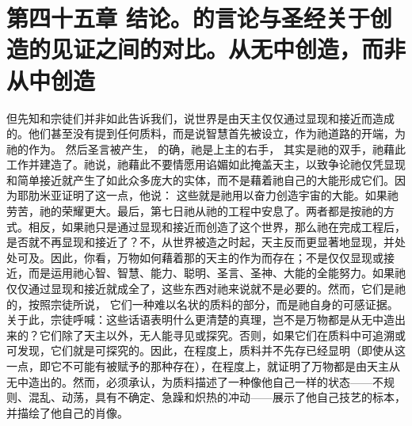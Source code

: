 
\section{第四十五章  结论。的言论与圣经关于创造的见证之间的对比。从无中创造，而非从中创造}

但先知和宗徒们并非如此告诉我们，说世界是由天主仅仅通过显现和接近而造成的。他们甚至没有提到任何质料，而是说智慧首先被设立，作为祂道路的开端，为祂的作为。 然后圣言被产生， 的确，祂是上主的右手， 其实是祂的双手，祂藉此工作并建造了。祂说，祂藉此不要情愿用谄媚如此掩盖天主，以致争论祂仅凭显现和简单接近就产生了如此众多庞大的实体，而不是藉着祂自己的大能形成它们。因为耶肋米亚证明了这一点，他说： 这些就是祂用以奋力创造宇宙的大能。如果祂劳苦，祂的荣耀更大。最后，第七日祂从祂的工程中安息了。两者都是按祂的方式。相反，如果祂只是通过显现和接近而创造了这个世界，那么祂在完成工程后，是否就不再显现和接近了？不，从世界被造之时起，天主反而更显著地显现，并处处可及。因此，你看，万物如何藉着那的天主的作为而存在；不是仅仅显现或接近，而是运用祂心智、智慧、能力、聪明、圣言、圣神、大能的全能努力。如果祂仅仅通过显现和接近就成全了，这些东西对祂来说就不是必要的。然而，它们是祂的，按照宗徒所说， 它们一种难以名状的质料的部分，而是祂自身的可感证据。 关于此，宗徒呼喊：这些话语表明什么更清楚的真理，岂不是万物都是从无中造出来的？它们除了天主以外，无人能寻见或探究。否则，如果它们在质料中可追溯或可发现，它们就是可探究的。因此，在程度上，质料并不先存已经显明（即使从这一点，即它不可能有被赋予的那种存在），在程度上，就证明了万物都是由天主从无中造出的。然而，必须承认，为质料描述了一种像他自己一样的状态——不规则、混乱、动荡，具有不确定、急躁和炽热的冲动——展示了他自己技艺的标本，并描绘了他自己的肖像。\par

